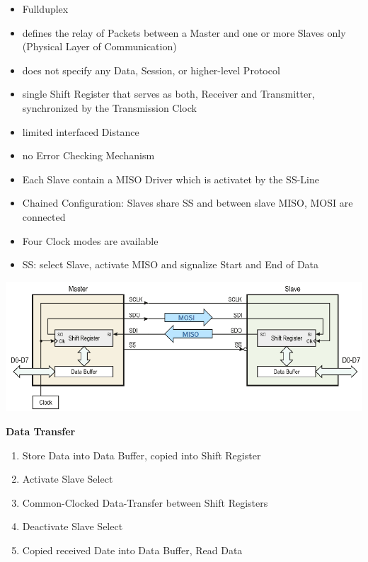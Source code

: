 \begin{multicols}{2}
    \begin{itemize}
    	\item Fullduplex
    	\item defines the relay of Packets between a Master and one or more Slaves only (Physical Layer of Communication)
    	\item does not specify any Data, Session, or higher-level Protocol
    	\item single Shift Register that serves as both, Receiver and Transmitter, synchronized by the Transmission Clock
    	\item limited interfaced Distance
    	\item no Error Checking Mechanism
    	\item Each Slave contain a MISO Driver which is activatet by the SS-Line
    	\item Chained Configuration: Slaves share SS and between slave MISO, MOSI are connected
    	\item Four Clock modes are available
    	\item SS: select Slave, activate MISO and signalize Start and End of Data
    \end{itemize}
\end{multicols}
\begin{minipage}{0.6\linewidth}
    \includegraphics[width=\linewidth]{images/spi.png}
\end{minipage}
\begin{minipage}{0.4\linewidth}
     \textbf{Data Transfer}
    \begin{enumerate}
    	\item Store Data into Data Buffer, copied into Shift Register
    	\item Activate Slave Select
    	\item Common-Clocked Data-Transfer between Shift Registers
    	\item Deactivate Slave Select
    	\item Copied received Date into Data Buffer, Read Data
    \end{enumerate}
\end{minipage}
\clearpage
\pagebreak

